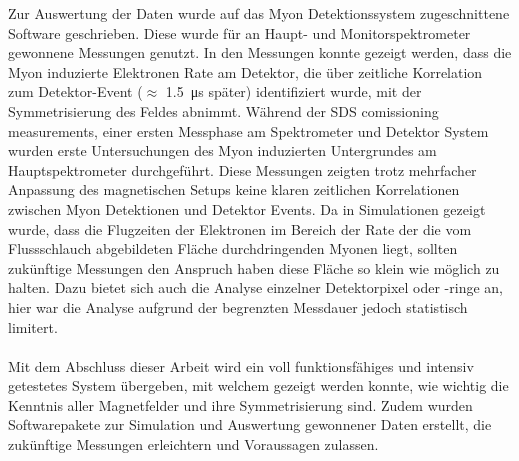 Zur Auswertung der Daten wurde auf das Myon Detektionssystem zugeschnittene Software geschrieben. Diese wurde f\"ur an Haupt- und Monitorspektrometer gewonnene Messungen genutzt.
In den Messungen konnte gezeigt werden, dass die Myon induzierte Elektronen Rate am Detektor, die \"uber zeitliche Korrelation zum Detektor-Event ($\approx$ \SI{1,5}{\micro\second} sp\"ater) identifiziert wurde, mit der Symmetrisierung des Feldes abnimmt. W\"ahrend der \glqq SDS comissioning measurements\grqq, einer ersten Messphase am Spektrometer und Detektor System wurden erste Untersuchungen des Myon induzierten Untergrundes am Hauptspektrometer durchgef\"uhrt. Diese Messungen zeigten trotz mehrfacher Anpassung des magnetischen Setups keine klaren zeitlichen Korrelationen zwischen Myon Detektionen und Detektor Events. Da in Simulationen gezeigt wurde, dass die Flugzeiten der Elektronen im Bereich der Rate der die vom Flussschlauch abgebildeten Fl\"ache durchdringenden Myonen liegt, sollten zuk\"unftige Messungen den Anspruch haben diese Fl\"ache so klein wie m\"oglich zu halten. Dazu bietet sich auch die Analyse einzelner Detektorpixel oder -ringe an, hier war die Analyse aufgrund der begrenzten Messdauer jedoch statistisch limitert.\\\\
Mit dem Abschluss dieser Arbeit wird ein voll funktionsf\"ahiges und intensiv getestetes System \"ubergeben, mit welchem gezeigt werden konnte, wie wichtig die Kenntnis aller Magnetfelder und ihre Symmetrisierung sind. Zudem wurden Softwarepakete zur Simulation und Auswertung gewonnener Daten erstellt, die zuk\"unftige Messungen erleichtern und Voraussagen zulassen.




